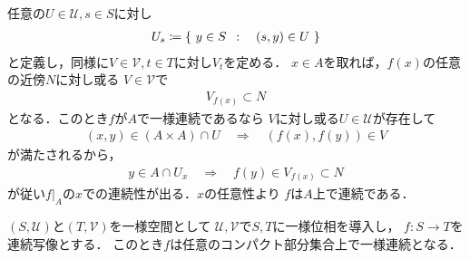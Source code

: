 	\begin{prf}
		任意の$U \in \mathscr{U},s \in S$に対し
		\begin{align}
			U_s \coloneqq \left\{\ y \in S\ \, : \quad (s,y) \in U\ \right\}
		\end{align}
		と定義し，同様に$V \in \mathscr{V},t \in T$に対し$V_t$を定める．
		$x \in A$を取れば，$f(x)$の任意の近傍$N$に対し或る
		$V \in \mathscr{V}$で
		\begin{align}
			V_{f(x)} \subset N
		\end{align}
		となる．このとき$f$が$A$で一様連続であるなら
		$V$に対し或る$U \in \mathscr{U}$が存在して
		\begin{align}
			(x,y) \in (A \times A) \cap U 
			\quad \Longrightarrow \quad (f(x),f(y)) \in V
		\end{align}
		が満たされるから，
		\begin{align}
			y \in A \cap U_x \quad \Longrightarrow \quad
			f(y) \in V_{f(x)} \subset N
		\end{align}
		が従い$\left. f\right|_A$の$x$での連続性が出る．$x$の任意性より
		$f$は$A$上で連続である．
		\QED
	\end{prf}
	
	\begin{screen}
		\begin{thm}[連続写像はコンパクト集合上で一様連続]
			$(S,\mathscr{U})$と$(T,\mathscr{V})$を一様空間として
			$\mathscr{U},\mathscr{V}$で$S,T$に一様位相を導入し，
			$f:S \longrightarrow T$を連続写像とする．
			このとき$f$は任意のコンパクト部分集合上で一様連続となる．
		\end{thm}
	\end{screen}
	
